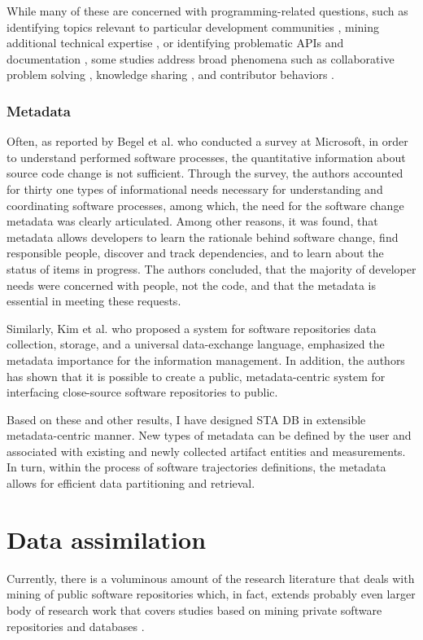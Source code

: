 While many of these are concerned with programming-related questions, such as identifying topics relevant to particular 
development communities \cite{kartik:msr14}, mining additional technical expertise \cite{VenkataramaniGAMB13} \cite{SaxeMG13}, 
or identifying problematic APIs \cite{KavalerPGCDF13} \cite{Linares2013Exploratory} and documentation \cite{Campbell2013Deficient},
some studies address broad phenomena such as collaborative problem solving \cite{Tausczik2014Collaborative},
knowledge sharing \cite{VasilescuCSCW14} \cite{Schenk2013Geo}, and contributor behaviors \cite{Bosu2013Building} \cite{GinscaP13}.

\subsubsection{Metadata}
Often, as reported by Begel et al. \cite{citeulike:7260421} who conducted a survey at Microsoft, in order to understand 
performed software processes, the quantitative information about source code change is not sufficient. 
Through the survey, the authors accounted for thirty one types of informational needs necessary for understanding and 
coordinating software processes, among which, the need for the software change metadata was clearly articulated. 
Among other reasons, it was found, that metadata allows developers to learn the rationale behind software change,
find responsible people, discover and track dependencies, and to learn about the status of items in progress. 
The authors concluded, that the majority of developer needs were concerned with people, not the code, and that the 
metadata is essential in meeting these requests.

Similarly, Kim et al. \cite{citeulike:4000311} who proposed a system for software repositories data collection, storage, 
and a universal data-exchange language, emphasized the metadata importance for the information management.
In addition, the authors has shown that it is possible to create a public, metadata-centric system for interfacing 
close-source software repositories to public.

Based on these and other results, I have designed STA DB in extensible metadata-centric manner. 
New types of metadata can be defined by the user and associated with existing and newly collected artifact entities 
and measurements. In turn, within the process of software trajectories definitions, the metadata allows for efficient 
data partitioning and retrieval.

\section{Data assimilation}
Currently, there is a voluminous amount of the research literature that deals with mining of public software repositories 
\cite{citeulike:2710928} which, in fact, extends probably even larger body of research work that covers studies based on mining 
private software repositories and databases \cite{citeulike:393158} \cite{citeulike:13125375} \cite{citeulike:13125481}.

